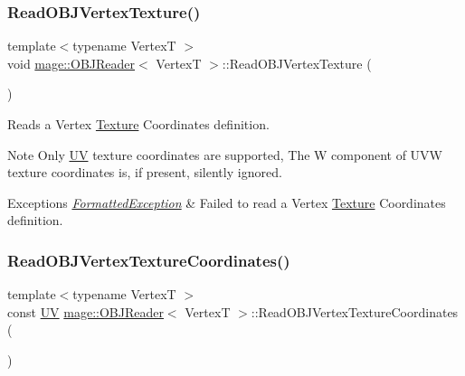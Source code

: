 \subsubsection{\texorpdfstring{Read\+O\+B\+J\+Vertex\+Texture()}{ReadOBJVertexTexture()}}
{\footnotesize\ttfamily template$<$typename VertexT $>$ \\
void \hyperlink{classmage_1_1_o_b_j_reader}{mage\+::\+O\+B\+J\+Reader}$<$ VertexT $>$\+::Read\+O\+B\+J\+Vertex\+Texture (\begin{DoxyParamCaption}{ }\end{DoxyParamCaption})\hspace{0.3cm}{\ttfamily [private]}}

Reads a Vertex \hyperlink{classmage_1_1_texture}{Texture} Coordinates definition.

\begin{DoxyNote}{Note}
Only \hyperlink{structmage_1_1_u_v}{UV} texture coordinates are supported, The W component of U\+VW texture coordinates is, if present, silently ignored. 
\end{DoxyNote}

\begin{DoxyExceptions}{Exceptions}
{\em \hyperlink{structmage_1_1_formatted_exception}{Formatted\+Exception}} & Failed to read a Vertex \hyperlink{classmage_1_1_texture}{Texture} Coordinates definition. \\
\hline
\end{DoxyExceptions}
\hypertarget{classmage_1_1_o_b_j_reader_a9b1a38d60a9d1c5c9095394fa37375e6}{}\label{classmage_1_1_o_b_j_reader_a9b1a38d60a9d1c5c9095394fa37375e6} 
\subsubsection{\texorpdfstring{Read\+O\+B\+J\+Vertex\+Texture\+Coordinates()}{ReadOBJVertexTextureCoordinates()}}
{\footnotesize\ttfamily template$<$typename VertexT $>$ \\
const \hyperlink{structmage_1_1_u_v}{UV} \hyperlink{classmage_1_1_o_b_j_reader}{mage\+::\+O\+B\+J\+Reader}$<$ VertexT $>$\+::Read\+O\+B\+J\+Vertex\+Texture\+Coordinates (\begin{DoxyParamCaption}{ }\end{DoxyParamCaption})\hspace{0.3cm}{\ttfamily [private]}}

